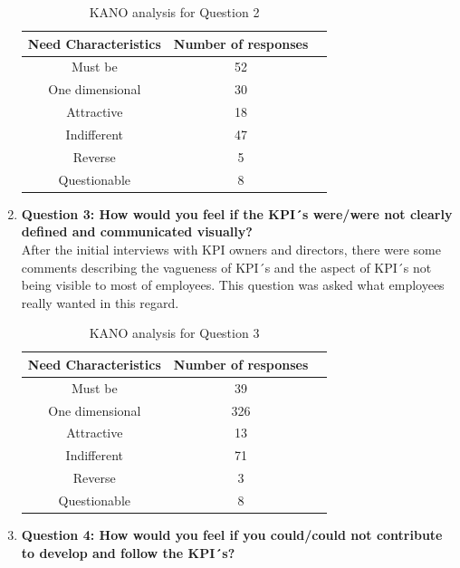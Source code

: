 \begin{enumerate}
\begin{table}[h]
    \centering
    \begin{tabular}{|c|c|c|}
    \hline
    \textbf{Need Characteristics} & \textbf{Number of responses} \\
    \hline
     Must be & 52\\\hline
     One dimensional & 30\\\hline
     Attractive & 18\\\hline
     Indifferent & 47 \\\hline
     Reverse & 5\\\hline
     Questionable & 8\\
    \hline
    \end{tabular}
    \caption{KANO analysis for Question 2}
    \label{tab:KANO2}
\end{table}


    \item \textbf{Question 3: How would you feel if the KPI´s were/were not clearly defined and communicated visually?}\\

After the initial interviews with KPI owners and directors, there were some comments describing the vagueness of KPI´s and the aspect of KPI´s not being visible to most of employees. This question was asked what employees really wanted in this regard.\\

\begin{table}[h]
    \centering
    \begin{tabular}{|c|c|c|}
    \hline
    \textbf{Need Characteristics} & \textbf{Number of responses} \\
    \hline
     Must be & 39\\\hline
     One dimensional & 326\\\hline
     Attractive & 13\\\hline
     Indifferent & 71 \\\hline
     Reverse & 3\\\hline
     Questionable & 8\\
    \hline
    \end{tabular}
    \caption{KANO analysis for Question 3}
    \label{tab:KANO3}
\end{table}


    \item \textbf{Question 4: How would you feel if you could/could not contribute to develop and follow the KPI´s?}\\


\end{enumerate}

